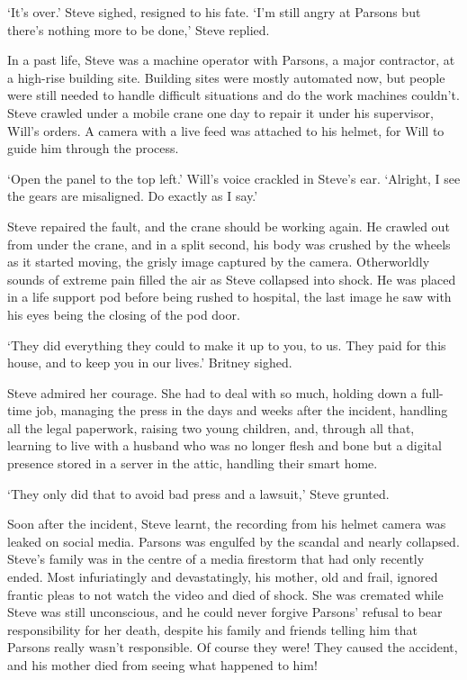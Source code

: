 `It's over.' Steve sighed, resigned to his fate. `I'm still angry at Parsons but there's nothing more to be done,' Steve replied.

In a past life, Steve was a machine operator with Parsons, a major contractor, at a high-rise building site. Building sites were mostly automated now, but people were still needed to handle difficult situations and do the work machines couldn't. Steve crawled under a mobile crane one day to repair it under his supervisor, Will's orders. A camera with a live feed was attached to his helmet, for Will to guide him through the process.

`Open the panel to the top left.' Will's voice crackled in Steve's ear. `Alright, I see the gears are misaligned. Do exactly as I say.'

Steve repaired the fault, and the crane should be working again. He crawled out from under the crane, and in a split second, his body was crushed by the wheels as it started moving, the grisly image captured by the camera. Otherworldly sounds of extreme pain filled the air as Steve collapsed into shock. He was placed in a life support pod before being rushed to hospital, the last image he saw with his eyes being the closing of the pod door.

`They did everything they could to make it up to you, to us. They paid for this house, and to keep you in our lives.' Britney sighed.

Steve admired her courage. She had to deal with so much, holding down a full-time job, managing the press in the days and weeks after the incident, handling all the legal paperwork, raising two young children, and, through all that, learning to live with a husband who was no longer flesh and bone but a digital presence stored in a server in the attic, handling their smart home.

`They only did that to avoid bad press and a lawsuit,' Steve grunted.

Soon after the incident, Steve learnt, the recording from his helmet camera was leaked on social media. Parsons was engulfed by the scandal and nearly collapsed. Steve's family was in the centre of a media firestorm that had only recently ended. Most infuriatingly and devastatingly, his mother, old and frail, ignored frantic pleas to not watch the video and died of shock. She was cremated while Steve was still unconscious, and he could never forgive Parsons' refusal to bear responsibility for her death, despite his family and friends telling him that Parsons really wasn't responsible. Of course they were! They caused the accident, and his mother died from seeing what happened to him!

